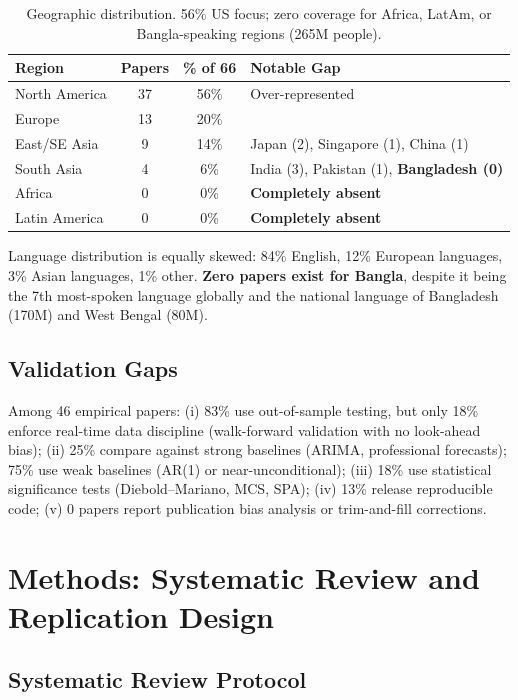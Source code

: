 \documentclass[11pt]{article}
\begin{document}
\begin{table}[H]
\centering
\begin{tabular}{lccl}
\toprule
\textbf{Region} & \textbf{Papers} & \textbf{\% of 66} & \textbf{Notable Gap} \\
\midrule
North America & 37 & 56\% & Over-represented \\
Europe & 13 & 20\% & \\
East/SE Asia & 9 & 14\% & Japan (2), Singapore (1), China (1) \\
South Asia & 4 & 6\% & India (3), Pakistan (1), \textbf{Bangladesh (0)} \\
Africa & 0 & 0\% & \textbf{Completely absent} \\
Latin America & 0 & 0\% & \textbf{Completely absent} \\
\bottomrule
\end{tabular}
\caption{Geographic distribution. 56\% US focus; zero coverage for Africa, LatAm, or Bangla-speaking regions (265M people).}
\end{table}

Language distribution is equally skewed: 84\% English, 12\% European languages, 3\% Asian languages, 1\% other. \textbf{Zero papers exist for Bangla}, despite it being the 7th most-spoken language globally and the national language of Bangladesh (170M) and West Bengal (80M).

\subsection{Validation Gaps}

Among 46 empirical papers: (i) 83\% use out-of-sample testing, but only 18\% enforce real-time data discipline (walk-forward validation with no look-ahead bias); (ii) 25\% compare against strong baselines (ARIMA, professional forecasts); 75\% use weak baselines (AR(1) or near-unconditional); (iii) 18\% use statistical significance tests (Diebold--Mariano, MCS, SPA); (iv) 13\% release reproducible code; (v) 0 papers report publication bias analysis or trim-and-fill corrections.

\section{Methods: Systematic Review and Replication Design}

\subsection{Systematic Review Protocol}
\end{document}
